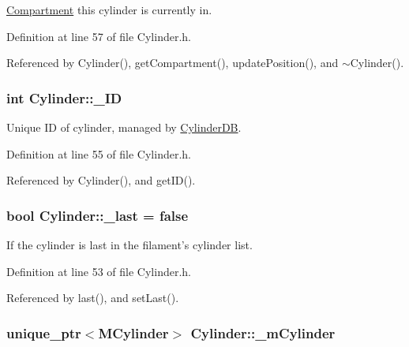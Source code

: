 \hyperlink{classCompartment}{Compartment} this cylinder is currently in. 



Definition at line 57 of file Cylinder.\+h.



Referenced by Cylinder(), get\+Compartment(), update\+Position(), and $\sim$\+Cylinder().

\hypertarget{classCylinder_ab64067f964d785fe166b8a05e5885065}{
\subsubsection[{\+\_\+\+I\+D}]{\setlength{\rightskip}{0pt plus 5cm}int Cylinder\+::\+\_\+\+I\+D\hspace{0.3cm}{\ttfamily [private]}}}\label{classCylinder_ab64067f964d785fe166b8a05e5885065}


Unique I\+D of cylinder, managed by \hyperlink{classCylinderDB}{Cylinder\+D\+B}. 



Definition at line 55 of file Cylinder.\+h.



Referenced by Cylinder(), and get\+I\+D().

\hypertarget{classCylinder_ae06f9e43f297b9a2fef8b4b08889c852}{
\subsubsection[{\+\_\+last}]{\setlength{\rightskip}{0pt plus 5cm}bool Cylinder\+::\+\_\+last = false\hspace{0.3cm}{\ttfamily [private]}}}\label{classCylinder_ae06f9e43f297b9a2fef8b4b08889c852}


If the cylinder is last in the filament's cylinder list. 



Definition at line 53 of file Cylinder.\+h.



Referenced by last(), and set\+Last().

\hypertarget{classCylinder_acdd582d5e2c3ede46122e1785097e5c3}{
\subsubsection[{\+\_\+m\+Cylinder}]{\setlength{\rightskip}{0pt plus 5cm}unique\+\_\+ptr$<${\bf M\+Cylinder}$>$ Cylinder\+::\+\_\+m\+Cylinder\hspace{0.3cm}{\ttfamily [private]}}}\label{classCylinder_acdd582d5e2c3ede46122e1785097e5c3}



